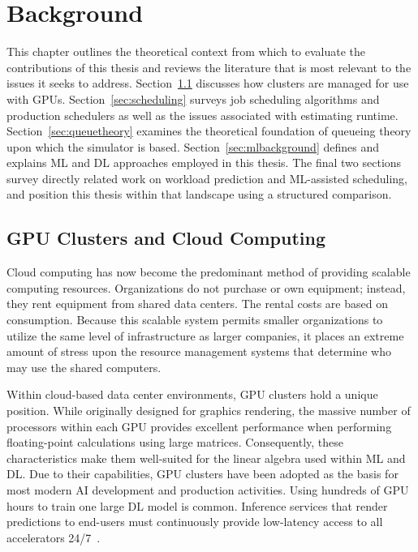 \chapter{Background}\label{chp:relatedwork}

This chapter outlines the theoretical context from which to evaluate the contributions of this thesis and reviews the literature that is most relevant to the issues it seeks to address. Section~\ref{sec:gpuclusters} discusses how clusters are managed for use with GPUs. Section~\ref{sec:scheduling} surveys job scheduling algorithms and production schedulers as well as the issues associated with estimating runtime. Section~\ref{sec:queuetheory} examines the theoretical foundation of queueing theory upon which the simulator is based. Section~\ref{sec:mlbackground} defines and explains ML and DL approaches employed in this thesis.  The final two sections survey directly related work on workload prediction and ML-assisted scheduling, and position this thesis within that landscape using a structured comparison.

\section{GPU Clusters and Cloud Computing}
\label{sec:gpuclusters}

Cloud computing has now become the predominant method of providing scalable computing resources. Organizations do not purchase or own equipment; instead, they rent equipment from shared data centers. The rental costs are based on consumption. Because this scalable system permits smaller organizations to utilize the same level of infrastructure as larger companies, it places an extreme amount of stress upon the resource management systems that determine who may use the shared computers.

Within cloud-based data center environments, GPU clusters hold a unique position. While originally designed for graphics rendering, the massive number of processors within each GPU provides excellent performance when performing floating-point calculations using large matrices. Consequently, these characteristics make them well-suited for the linear algebra used within ML and DL. Due to their capabilities, GPU clusters have been adopted as the basis for most modern AI development and production activities. Using hundreds of GPU hours to train one large DL model is common. Inference services that render predictions to end-users must continuously provide low-latency access to all accelerators 24/7~\cite{weng2022mlaas}.

